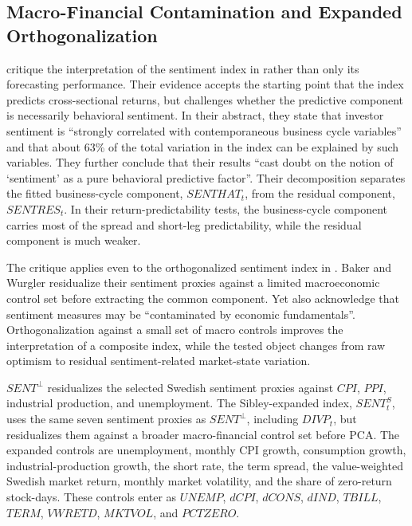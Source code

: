 \documentclass[11pt]{article}
\newcommand{\var}[1]{\ensuremath{#1}}
\begin{document}
\subsection{Macro-Financial Contamination and Expanded Orthogonalization}
\citet{sibley2012sentimental} critique the interpretation of the sentiment index in \citet{baker2006sentiment} rather than only its forecasting performance. Their evidence accepts the starting point that the index predicts cross-sectional returns, but challenges whether the predictive component is necessarily behavioral sentiment. In their abstract, they state that investor sentiment is \enquote{strongly correlated with contemporaneous business cycle variables} and that about 63\% of the total variation in the index can be explained by such variables. They further conclude that their results \enquote{cast doubt on the notion of \enquote{sentiment} as a pure behavioral predictive factor}. Their decomposition separates the fitted business-cycle component, \var{SENTHAT_t}, from the residual component, \var{SENTRES_t}. In their return-predictability tests, the business-cycle component carries most of the spread and short-leg predictability, while the residual component is much weaker.

The critique applies even to the orthogonalized sentiment index in \citet{baker2006sentiment}. Baker and Wurgler residualize their sentiment proxies against a limited macroeconomic control set before extracting the common component. Yet \citet{baker2007} also acknowledge that sentiment measures may be \enquote{contaminated by economic fundamentals}. Orthogonalization against a small set of macro controls improves the interpretation of a composite index, while the tested object changes from raw optimism to residual sentiment-related market-state variation.

\var{SENT^{\perp}} residualizes the selected Swedish sentiment proxies against \var{CPI}, \var{PPI}, industrial production, and unemployment. The Sibley-expanded index, \var{SENT^{S}_{t}}, uses the same seven sentiment proxies as \var{SENT^{\perp}}, including \var{DIVP_t}, but residualizes them against a broader macro-financial control set before PCA. The expanded controls are unemployment, monthly CPI growth, consumption growth, industrial-production growth, the short rate, the term spread, the value-weighted Swedish market return, monthly market volatility, and the share of zero-return stock-days. These controls enter as \var{UNEMP}, \var{dCPI}, \var{dCONS}, \var{dIND}, \var{TBILL}, \var{TERM}, \var{VWRETD}, \var{MKTVOL}, and \var{PCTZERO}.
\end{document}

